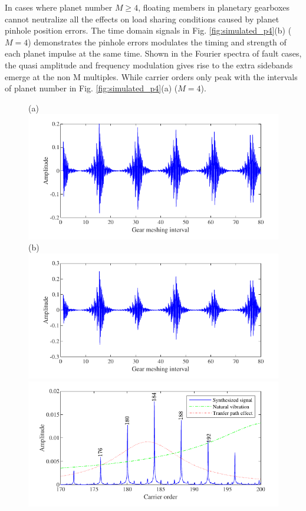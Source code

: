 \documentclass[a4paper,fleqn]{cas-sc}%
\begin{document}
\par In cases where planet number $M\geq4$, floating members in planetary gearboxes cannot neutralize all the effects on load sharing conditions caused by planet pinhole position errors. The time domain signals in Fig. \ref{fig:simulated_p4}(b) ($M=4$) demonstrates the  pinhole errors modulates the  timing and strength of  each planet impulse at the same time. Shown in the Fourier spectra of fault cases, the quasi amplitude and frequency modulation gives rise to the extra sidebands emerge at the non M multiples. While carrier orders only peak with the intervals of  planet number in Fig. \ref{fig:simulated_p4}(a) ($M=4$).
\begin{figure}[pos=htbp]
    \centering
    (a) \includegraphics[scale=\myscale,valign=t]{Time_p4_normal.pdf}
    (b) \includegraphics[scale=\myscale,valign=t]{Time_p4_fault.pdf}\\
    \hspace*{1.5em}\includegraphics[scale=\myscale,valign=t]{Freq_p4_normal.pdf}

\end{figure}
\end{document}
